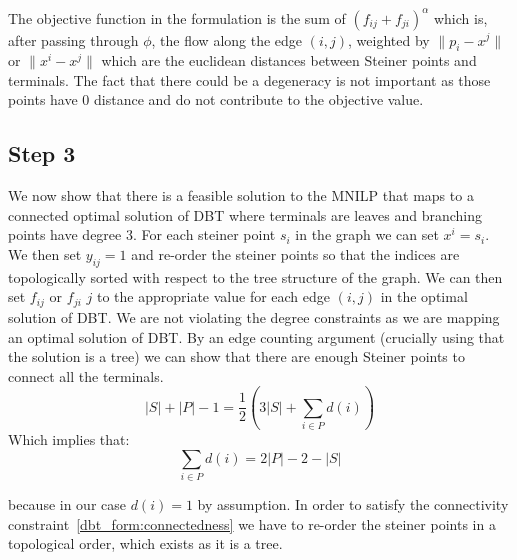 \documentclass[11pt,reqno,a4paper]{amsart}
\numberwithin{equation}{section}
\theoremstyle{mytheorem}
\theoremstyle{myremark}
\theoremstyle{myparagraph}
\begin{document}
    The objective function in the formulation is the sum of $(f_{ij} + f_{ji})^\alpha$ which is, after passing through $\phi$, the flow
    along the edge $(i,j)$, weighted by $\| p_i - x^j \|$ or $\|x^i-x^j \|$ which are the euclidean distances between
    Steiner points and terminals.
    The fact that there could be a degeneracy is not important as those points have $0$ distance and do not contribute to the
    objective value.

    \subsection{Step 3}

    We now show that there is a feasible solution to the MNILP that maps to a connected optimal solution of DBT where terminals are
    leaves and branching points have degree 3.
    For each steiner point $s_i$ in the graph we can set $x^i = s_i$. We then set $y_{ij} = 1$ and re-order the steiner points
    so that the indices are topologically sorted with respect to the tree structure of the graph.
    We can then set $f_{ij}$ or $f_{ji}$ $j$ to the appropriate value for each edge $(i,j)$ in the optimal solution of DBT.
    We are not violating the degree constraints as we are mapping an optimal solution of DBT.
    By an edge counting argument (crucially using that the solution is a tree) we can show that there are enough Steiner points to connect all the terminals.
    \begin{equation}
        |S| + |P| - 1 = \frac{1}{2} \left( 3|S| + \sum_{i \in P} d(i) \right)
    \end{equation}
    Which implies that:
    \begin{equation}
        \label{eq:edge_counting}
        \sum_{i \in P} d(i) = 2|P| - 2 - |S|
    \end{equation}

    because in our case $d(i)=1$ by assumption.
    In order to satisfy the connectivity constraint~\ref{dbt_form:connectedness} we have to re-order
    the steiner points in a topological order, which exists as it is a tree.
\end{document}
